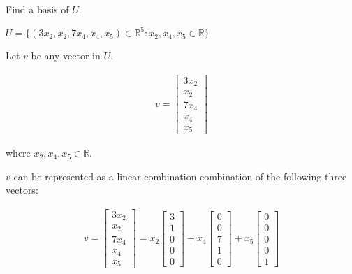 \documentclass[fleqn]{article}
\begin{document}
\begin{enumerate}[nolistsep]
\begin{enumerate}[nolistsep]
				Find a basis of $U$.
				
				$U = \{(3x_2, x_2, 7x_4, x_4, x_5) \in \mathbb{R}^5 : x_2, x_4, x_5 \in \mathbb{R}\}$
				
				Let $v$ be any vector in $U$.
				
				\begin{singlespacing}
					\setlength{\abovedisplayskip}{0pt}
					\setlength{\belowdisplayskip}{10pt}
					\setlength{\abovedisplayshortskip}{0pt}
					\setlength{\belowdisplayshortskip}{10pt}
					\setlength{\mathindent}{0pt}
					\begin{align*}
					 v = \begin{bmatrix}3x_2 \\ x_2 \\ 7x_4 \\ x_4 \\ x_5 \end{bmatrix}
					\end{align*}
				\end{singlespacing}
				
				where $x_2, x_4, x_5 \in \mathbb{R}$.
				
				$v$ can be represented as a linear combination combination of the following three vectors:
				
				\begin{singlespacing}
					\setlength{\abovedisplayskip}{0pt}
					\setlength{\belowdisplayskip}{10pt}
					\setlength{\abovedisplayshortskip}{0pt}
					\setlength{\belowdisplayshortskip}{10pt}
					\setlength{\mathindent}{0pt}
					\begin{align*}
					v = \begin{bmatrix}3x_2 \\ x_2 \\ 7x_4 \\ x_4 \\ x_5 \end{bmatrix} = x_2 \begin{bmatrix}3 \\ 1 \\ 0 \\ 0 \\ 0 \end{bmatrix} + x_4 \begin{bmatrix}0 \\ 0 \\ 7 \\ 1 \\ 0 \end{bmatrix} + x_5 \begin{bmatrix}0 \\ 0 \\ 0 \\ 0 \\ 1 \end{bmatrix}
					\end{align*}
				\end{singlespacing}
									
					
			\end{enumerate}
	\end{enumerate}
	
\end{document}
